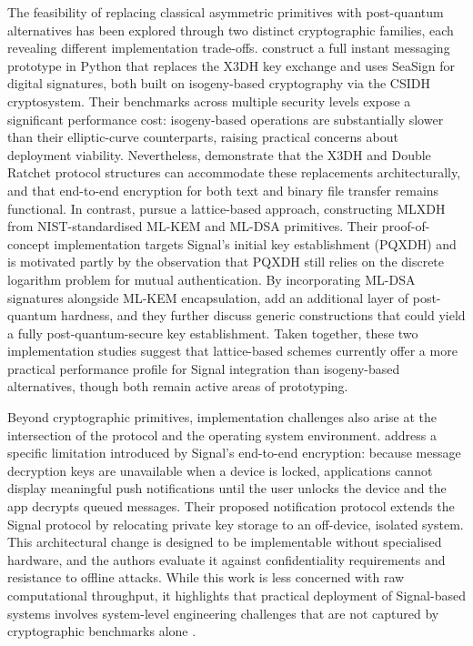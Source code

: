 The feasibility of replacing classical asymmetric primitives with post-quantum alternatives has been explored through two distinct cryptographic families, each revealing different implementation trade-offs. \textcite{jankowski2025} construct a full instant messaging prototype in Python that replaces the X3DH key exchange and uses SeaSign for digital signatures, both built on isogeny-based cryptography via the CSIDH cryptosystem. Their benchmarks across multiple security levels expose a significant performance cost: isogeny-based operations are substantially slower than their elliptic-curve counterparts, raising practical concerns about deployment viability. Nevertheless, \textcite{jankowski2025} demonstrate that the X3DH and Double Ratchet protocol structures can accommodate these replacements architecturally, and that end-to-end encryption for both text and binary file transfer remains functional. In contrast, \textcite{angom2025} pursue a lattice-based approach, constructing MLXDH from NIST-standardised ML-KEM and ML-DSA primitives. Their proof-of-concept implementation targets Signal's initial key establishment (PQXDH) and is motivated partly by the observation that PQXDH still relies on the discrete logarithm problem for mutual authentication. By incorporating ML-DSA signatures alongside ML-KEM encapsulation, \textcite{angom2025} add an additional layer of post-quantum hardness, and they further discuss generic constructions that could yield a fully post-quantum-secure key establishment. Taken together, these two implementation studies suggest that lattice-based schemes currently offer a more practical performance profile for Signal integration than isogeny-based alternatives, though both remain active areas of prototyping.

Beyond cryptographic primitives, implementation challenges also arise at the intersection of the protocol and the operating system environment. \textcite{almari2024} address a specific limitation introduced by Signal's end-to-end encryption: because message decryption keys are unavailable when a device is locked, applications cannot display meaningful push notifications until the user unlocks the device and the app decrypts queued messages. Their proposed notification protocol extends the Signal protocol by relocating private key storage to an off-device, isolated system. This architectural change is designed to be implementable without specialised hardware, and the authors evaluate it against confidentiality requirements and resistance to offline attacks. While this work is less concerned with raw computational throughput, it highlights that practical deployment of Signal-based systems involves system-level engineering challenges that are not captured by cryptographic benchmarks alone \parencite{almari2024}.

